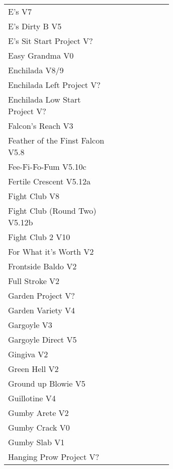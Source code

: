 \begin{flushleft}
\begin{center}
\begin{supertabular}{p{0.65\linewidth}r}
E's V7 & \pageref{rt:E's} \\
E's Dirty B V5 & \pageref{rt:E's Dirty B} \\
E's Sit Start Project V? & \pageref{vr:E's Sit Start Project} \\
Easy Grandma V0 & \pageref{rt:Easy Grandma} \\
Enchilada V8/9 & \pageref{rt:Enchilada} \\
Enchilada Left Project V? & \pageref{vr:Enchilada Left Project} \\
Enchilada Low Start Project V? & \pageref{vr:Enchilada Low Start Project} \\
Falcon's Reach V3 & \pageref{rt:Falcon's Reach} \\
Feather of the Finst Falcon V5.8 & \pageref{rt:Feather of the Finst Falcon} \\
Fee-Fi-Fo-Fum V5.10c & \pageref{rt:Fee-Fi-Fo-Fum} \\
Fertile Crescent V5.12a & \pageref{rt:Fertile Crescent} \\
Fight Club V8 & \pageref{rt:Fight Club} \\
Fight Club (Round Two) V5.12b & \pageref{rt:Fight Club (Round Two)} \\
Fight Club 2 V10 & \pageref{rt:Fight Club 2} \\
For What it's Worth V2 & \pageref{rt:For What it's Worth} \\
Frontside Baldo V2 & \pageref{rt:Frontside Baldo} \\
Full Stroke V2 & \pageref{rt:Full Stroke} \\
Garden Project V? & \pageref{rt:Garden Project} \\
Garden Variety V4 & \pageref{rt:Garden Variety} \\
Gargoyle V3 & \pageref{rt:Gargoyle} \\
Gargoyle Direct V5 & \pageref{vr:Gargoyle Direct} \\
Gingiva V2 & \pageref{rt:Gingiva} \\
Green Hell V2 & \pageref{rt:Green Hell} \\
Ground up Blowie V5 & \pageref{rt:Ground up Blowie} \\
Guillotine V4 & \pageref{rt:Guillotine} \\
Gumby Arete V2 & \pageref{rt:Gumby Arete} \\
Gumby Crack V0 & \pageref{rt:Gumby Crack} \\
Gumby Slab V1 & \pageref{rt:Gumby Slab} \\
Hanging Prow Project V? & \pageref{rt:Hanging Prow Project} \\

\end{supertabular}
\end{center}
\end{flushleft}

